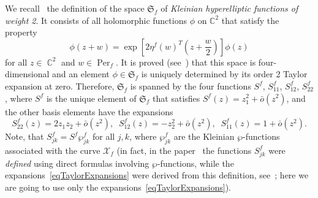 \documentclass{amsart}
\numberwithin{equation}{section}
\theoremstyle{definition}
\theoremstyle{remark}
\DeclareMathOperator{\CC}{\mathbb C}
\DeclareMathOperator{\Per}{Per}
\begin{document}
	We recall~\cite{KleinianWeight2} the definition of the space $\mathfrak S_f$ of {\it{Kleinian hyperelliptic functions of weight 2}}. It consists of all holomorphic functions $\phi$ on $\mathbb C^2$ that satisfy the property
	\begin{equation}\label{eqSpaceDef}
		\phi(z + w) = \exp\left[2\eta^f(w)^T\left(z + \frac{w}{2}\right)\right]\phi(z)
	\end{equation}
	for all $z \in \CC^2$ and $w \in \Per_f$. It is proved (see~\cite[Proposition~3.1~(iv)]{KleinianWeight2}) that this space is four-dimensional and an element $\phi \in \mathfrak S_f$ is uniquely determined by its order 2 Taylor expansion at zero. Therefore, $\mathfrak S_f$ is spanned by the four functions $S^f$, $S^f_{11}$, $S^f_{12}$, $S^f_{22}$, where $S^f$ is the unique element of $\mathfrak S_f$ that satisfies $S^f(z) = z_1^2 + \bar{o}(z^2)$, and the other basis elements have the expansions
	\begin{equation}\label{eqTaylorExpansions}
		S_{22}^f(z) = 2z_1z_2 + \bar{o}(z^2),\;\;
		S_{12}^f(z) = -z_2^2 + \bar{o}(z^2),\;\;
		S_{11}^f(z) = 1 + \bar{o}(z^2).
	\end{equation}
	Note, that $S_{jk}^f = S^f\wp_{jk}^f$ for all $j,k$, where $\wp_{jk}^f$ are the Kleinian $\wp$-functions associated with the curve $\mathcal X_f$ (in fact, in the paper~\cite{KleinianWeight2} the functions $S_{jk}^f$ were {\it{defined}} using direct formulas involving $\wp$-functions, while the expansions~\eqref{eqTaylorExpansions} were derived from this definition, see~\cite[Theorem~4.1]{KleinianWeight2}; here we are going to use only the expansions~\eqref{eqTaylorExpansions}).
	
\end{document}
